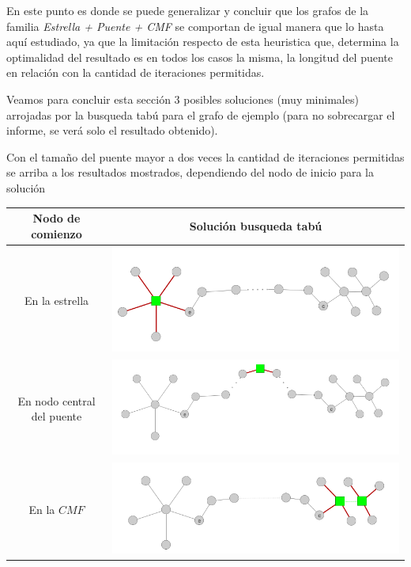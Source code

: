 En este punto es donde se puede generalizar y concluir que los 
grafos de la familia \emph{Estrella + Puente + CMF} se comportan
de igual manera que lo hasta aqu\'i estudiado, ya que la limitaci\'on
respecto de esta heuristica que, determina la optimalidad del resultado
es en todos los casos la misma, la longitud del puente en relaci\'on
con la cantidad de iteraciones permitidas.

Veamos para concluir esta secci\'on 3 posibles soluciones (muy minimales)
arrojadas por la busqueda tab\'u para el grafo de ejemplo (para no 
sobrecargar el informe, se ver\'a solo el resultado obtenido).

Con el tama\~no del puente mayor a dos veces la cantidad de iteraciones
permitidas se arriba a los resultados mostrados, dependiendo del nodo
de inicio para la soluci\'on


\begin{center}
\begin{tabular}{|c||c|}
	\hline
	Nodo de comienzo & Soluci\'on busqueda tab\'u \\
	\hline
	\hline
	En la estrella &
	\includegraphics[scale = 0.5]{img/ej3/tabu_search/dobleEstrella_st11.png} \\
	\hline
	En nodo central del puente &
	\includegraphics[scale = 0.5]{img/ej3/tabu_search/dobleEstrella_st21.png} \\
	\hline
	En la $CMF$ &
	\includegraphics[scale = 0.5]{img/ej3/tabu_search/dobleEstrella_st01.png} \\
	\hline
\end{tabular}
\end{center}

